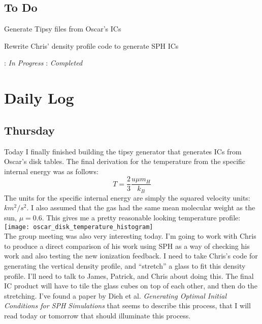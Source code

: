 \documentclass[11pt,letterpaper]{article}
\begin{document}
\subsection*{To Do}
\begin{bullets}
\item[\checkmark] Generate Tipsy files from Oscar's ICs
\item Rewrite Chris' density profile code to generate SPH ICs
\end{bullets}

\textleaf : \textit{In Progress} \qquad \checkmark : \textit{Completed}

\section*{Daily Log}
\subsection*{Thursday}
Today I finally finished building the tipsy generator that generates ICs from
Oscar's disk tables.  The final derivation for the temperature from the 
specific internal energy was as follows:
$$T = \frac{2}{3}\frac{u\mu m_H}{k_B}$$
The units for the specific internal energy are simply the squared velocity 
units: $km^2/s^2$. I also assumed that the gas had the same mean molecular 
weight as the sun, $\mu = 0.6$. This gives me a pretty reasonable looking 
temperature profile:\\
\texttt{[image: oscar\_disk\_temperature\_histogram]}\\
The group meeting was also very interesting today.  I'm going to work with Chris
to produce a direct comparison of his work using SPH as a way of checking his
work and also testing the new ionization feedback.  I need to take Chris's code
for generating the vertical density profile, and ``stretch'' a glass to fit this
density profile.  I'll need to talk to James, Patrick, and Chris about doing 
this.  The final IC product will have to tile the glass cubes on top of each 
other, and then do the stretching.  I've found a paper by Dieh et al. 
\textit{Generating Optimal Initial Conditions for SPH Simulations} that seems to
describe this process, that I will read today or tomorrow that should illuminate
this process.
\end{document}
